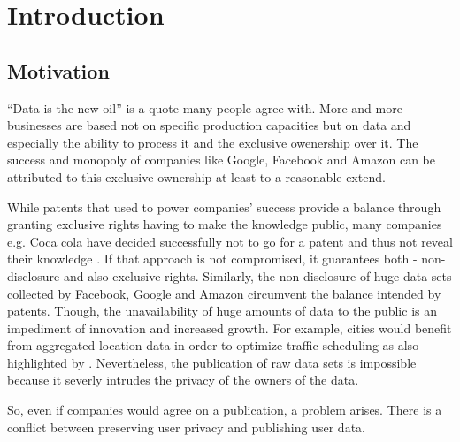 
\chapter{Introduction}\label{chapter:introduction}
\section{Motivation}

“Data is the new oil” is a quote \parencite{data-is-the-new-oil, data-is-the-new-oil2} many people agree with. More and more businesses are based not on specific production capacities but on data and especially the ability to process it and the exclusive owenership over it. The success and monopoly of companies like Google, Facebook and Amazon can be attributed to this exclusive ownership at least to a reasonable extend.

While patents that used to power companies' success provide a balance through granting exclusive rights having to make the knowledge public, many companies e.g. Coca cola have decided successfully not to go for a patent and thus not reveal their knowledge \parencite{coca-cola}. If that approach is not compromised, it guarantees both - non-disclosure and also exclusive rights. Similarly, the non-disclosure of huge data sets collected by Facebook, Google and Amazon circumvent the balance intended by patents. Though, the unavailability of huge amounts of data to the public is an impediment of innovation and increased growth. For example, cities would benefit from aggregated location data in order to optimize traffic scheduling as also highlighted by \parencite{hoh2005protecting}.
Nevertheless, the publication of raw data sets is impossible because it severly intrudes the privacy of the owners of the data.

So, even if companies would agree on a publication, a problem arises.
There is a conflict between preserving user privacy and publishing user data.

